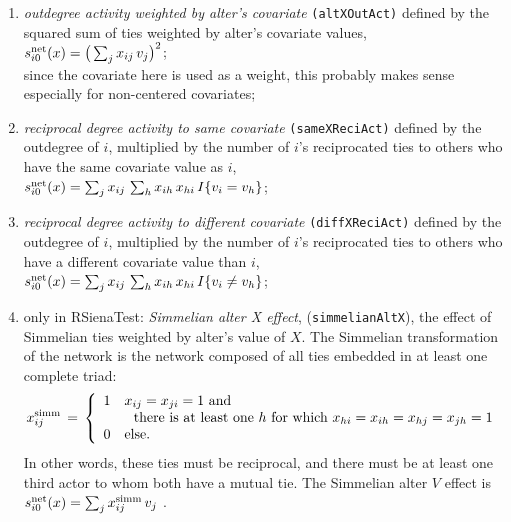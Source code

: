 \documentclass[a4paper,fleqn,11pt]{article}
\newcommand{\+}{\, + \,}
\newcommand{\vit}{\theenumi}
\begin{document}
\begin{enumerate}
 \item {\em outdegree activity weighted by alter's covariate}
  \texttt{(altXOutAct)} defined by the
 squared sum of ties weighted by alter's covariate values,\\
 $s^{\rm net}_{i\vit}(x) = \big(\sum_j x_{ij} \,v_j \big)^2 $;\\
 since the covariate here is used as a weight, this probably
 makes sense especially for non-centered covariates;


 \item {\em reciprocal degree activity to same covariate}
\texttt{(sameXReciAct)} defined by the outdegree of $i$,
 multiplied by the number of $i$'s reciprocated ties
 to others who have the same covariate value as $i$,\\
 $s^{\rm net}_{i\vit}(x) =  \sum_j x_{ij}\,
                \sum_h x_{ih}\,x_{hi}\, I\{v_i = v_h \} $;

 \item {\em reciprocal degree activity to different covariate}
\texttt{(diffXReciAct)} defined by the outdegree of $i$,
 multiplied by the number of $i$'s reciprocated ties
 to others who have a different covariate value than $i$,\\
 $s^{\rm net}_{i\vit}(x) =  \sum_j x_{ij}\,
                \sum_h x_{ih}\,x_{hi}\, I\{v_i \neq v_h \} $;


\item only in \textsf{RSienaTest}:  \emph{Simmelian alter X effect}, (\texttt{simmelianAltX}), the effect of
      Simmelian ties weighted by alter's value of $X$. The Simmelian transformation of the network is
      the network composed of all ties embedded in at least one complete triad:
\[
    x^{\rm{simm}}_{ij} \,=\, \left\{ \begin{array}{cl}
                               1 & x_{ij} = x_{ji} = 1 \text{ and} \\
                                  & \ \text{ there is at least one }
                                      h \text{ for which } x_{hi} = x_{ih} = x_{hj} = x_{jh} = 1 \\
                               0 & \text{else.}
                             \end{array} \right.
\]
      In other words, these ties must be reciprocal, and there must be at least one
      third actor to whom both have a mutual tie.
      The Simmelian alter $V$ effect  is  \\
$s^{\rm net}_{i\vit}(x ) = \sum_j  x^{\rm{simm}}_{ij}\,v_j $ .



\end{enumerate}
\end{document}
